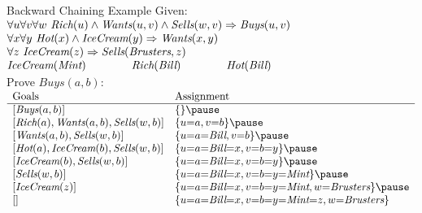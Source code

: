 \documentclass[14pt]{beamer}
\begin{document}
\begin{frame}[label=backward-chaining-example]{Backward Chaining Example}
\small
Given:\\
\tab$
\begin{array}{ @{} l @{\hspace{4em}} l @{\hspace{4em}} l @{}}
\lefteqn{\forall u \forall v \forall w\ \textit{Rich}(u) \land \textit{Wants}(u, v) \land \textit{Sells}(w, v) \limpl \textit{Buys}(u, v)} \\
\lefteqn{\forall x \forall y\ \textit{Hot}(x) \land \textit{IceCream}(y) \limpl \textit{Wants}(x, y)} \\
\lefteqn{\forall z\ \textit{IceCream}(z) \limpl \textit{Sells}(\textit{Brusters}, z)} \\
\textit{IceCream}(\textit{Mint})
& \textit{Rich}(\textit{Bill})
& \textit{Hot}(\textit{Bill})
\end{array}
$\\[0.5em]
Prove $\textit{Buys}(a, b)$:
\\[0.5em]
\pause
\footnotesize
$\thickmuskip=0mu
\begin{array}{ l l }
\mbox{Goals} & \mbox{Assignment} \\
\hline
\left[\textit{Buys}(a, b)\right]
& \{\}
\pause\\
\left[\textit{Rich}(a), \textit{Wants}(a, b), \textit{Sells}(w, b)\right]
& \{u=a, v=b\}
\pause\\
\left[\textit{Wants}(a, b), \textit{Sells}(w, b)\right]
& \{u=a=\textit{Bill}, v=b\}
\pause\\
\left[\textit{Hot}(a), \textit{IceCream}(b), \textit{Sells}(w, b)\right]
& \{u=a=\textit{Bill}=x, v=b=y\}
\pause\\
\left[\textit{IceCream}(b), \textit{Sells}(w, b)\right]
& \{u=a=\textit{Bill}=x, v=b=y\}
\pause\\
\left[\textit{Sells}(w, b)\right]
& \{u=a=\textit{Bill}=x, v=b=y=\textit{Mint}\}
\pause\\
\left[\textit{IceCream}(z)\right]
& \{u=a=\textit{Bill}=x, v=b=y=\textit{Mint}, w=\textit{Brusters}\}
\pause\\
\left[\right]
& \{u=a=\textit{Bill}=x, v=b=y=\textit{Mint}=z, w=\textit{Brusters}\}
\end{array}
$
\end{frame}
\end{document}
